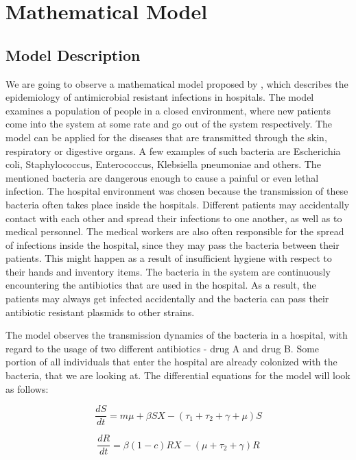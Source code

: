 \chapter{Mathematical Model}


\section{Model Description}

We are going to observe a mathematical model proposed by \cite{lips}, which describes the epidemiology of antimicrobial resistant infections in hospitals. The model examines a population of people in a closed environment, where new patients come into the system at some rate and go out of the system respectively. The model can be applied for the diseases that are transmitted through the skin, respiratory or digestive organs. A few examples of such bacteria are Escherichia coli, Staphylococcus, Enterococcus, Klebsiella pneumoniae and others. The mentioned bacteria are dangerous enough to cause a painful or even lethal infection. The hospital environment was chosen because the transmission of these bacteria often takes place inside the hospitals. Different patients may accidentally contact with each other and spread their infections to one another, as well as to medical personnel. The medical workers are also often responsible for the spread of infections inside the hospital, since they may pass the bacteria between their patients. This might happen as a result of insufficient hygiene with respect to their hands and inventory items. The bacteria in the system are continuously encountering the antibiotics that are used in the hospital. As a result, the patients may always get infected accidentally and the bacteria can pass their antibiotic resistant plasmids to other strains.

The model observes the transmission dynamics of the bacteria in a hospital, with regard to the usage of two different antibiotics - drug A and drug B. Some portion of all individuals that enter the hospital are already colonized with the bacteria, that we are looking at. The differential equations for the model will look as follows:

\begin{equation}
\frac{dS}{dt} = m \mu + \beta S X - (\tau_1 + \tau_2 + \gamma + \mu) S
\end{equation}

\begin{equation}
\frac{dR}{dt} = \beta (1 - c) R X - (\mu + \tau_2 + \gamma) R
\end{equation}

